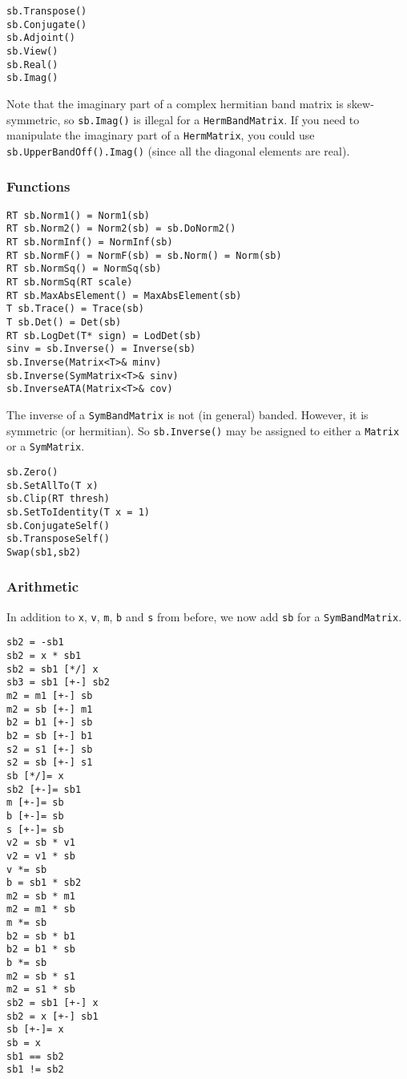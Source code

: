 \documentclass[twoside,letterpaper,11pt]{article}
\renewcommand{\tt}[1]{{\texttt {#1}}}
\begin{document}
\begin{verbatim}
sb.Transpose()
sb.Conjugate()
sb.Adjoint()
sb.View()
sb.Real()
sb.Imag()
\end{verbatim}
Note that the imaginary part of a complex hermitian band matrix is
skew-symmetric, so \tt{sb.Imag()} is illegal for a \tt{HermBandMatrix}.
If you need to manipulate the imaginary part of a \tt{HermMatrix}, 
you could use
\tt{sb.UpperBandOff().Imag()} 
(since all the diagonal elements are real).

\subsubsection{Functions}

\begin{verbatim}
RT sb.Norm1() = Norm1(sb)
RT sb.Norm2() = Norm2(sb) = sb.DoNorm2()
RT sb.NormInf() = NormInf(sb)
RT sb.NormF() = NormF(sb) = sb.Norm() = Norm(sb)
RT sb.NormSq() = NormSq(sb)
RT sb.NormSq(RT scale)
RT sb.MaxAbsElement() = MaxAbsElement(sb)
T sb.Trace() = Trace(sb)
T sb.Det() = Det(sb)
RT sb.LogDet(T* sign) = LodDet(sb)
sinv = sb.Inverse() = Inverse(sb)
sb.Inverse(Matrix<T>& minv)
sb.Inverse(SymMatrix<T>& sinv)
sb.InverseATA(Matrix<T>& cov)
\end{verbatim}
The inverse of a \tt{SymBandMatrix} is not (in general) banded.  
However, it is symmetric (or hermitian).
So \tt{sb.Inverse()} may be assigned to either a \tt{Matrix} or a \tt{SymMatrix}.

\begin{verbatim}
sb.Zero()
sb.SetAllTo(T x)
sb.Clip(RT thresh)
sb.SetToIdentity(T x = 1)
sb.ConjugateSelf()
sb.TransposeSelf()
Swap(sb1,sb2)
\end{verbatim}

\subsubsection{Arithmetic}

In addition to \tt{x}, \tt{v}, \tt{m}, \tt{b} and \tt{s} from before, 
we now add \tt{sb} for a \tt{SymBandMatrix}.

\begin{verbatim}
sb2 = -sb1
sb2 = x * sb1
sb2 = sb1 [*/] x
sb3 = sb1 [+-] sb2
m2 = m1 [+-] sb
m2 = sb [+-] m1
b2 = b1 [+-] sb
b2 = sb [+-] b1
s2 = s1 [+-] sb
s2 = sb [+-] s1
sb [*/]= x
sb2 [+-]= sb1
m [+-]= sb
b [+-]= sb
s [+-]= sb
v2 = sb * v1
v2 = v1 * sb
v *= sb
b = sb1 * sb2
m2 = sb * m1
m2 = m1 * sb
m *= sb
b2 = sb * b1
b2 = b1 * sb
b *= sb
m2 = sb * s1
m2 = s1 * sb
sb2 = sb1 [+-] x
sb2 = x [+-] sb1
sb [+-]= x
sb = x
sb1 == sb2
sb1 != sb2
\end{verbatim}
\end{document}
